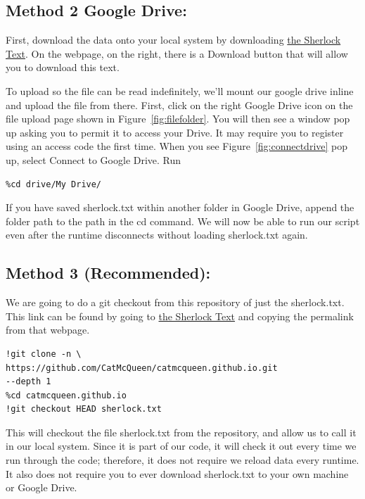 \documentclass{article}
\begin{document}
\subsection{Method 2 Google Drive:}

First, download the data onto your local system by downloading 
\href{https://github.com/CatMcQueen/catmcqueen.github.io/blob/b67a282c9be6bfd1ed17796c2507b9108cffb6bc/sherlock.txt}{the Sherlock Text}. On the webpage, on the right, there is a Download button that will allow you to download this text.

To upload so the file can be read indefinitely, we'll mount our google drive inline and upload the file from there. First, click on the right Google Drive icon on the file upload page shown in Figure~\ref{fig:filefolder}. You will then see a window pop up asking you to permit it to access your Drive. It may require you to register using an access code the first time. When you see Figure~\ref{fig:connectdrive} pop up, select Connect to Google Drive. Run

\begin{verbatim}
%cd drive/My Drive/
\end{verbatim}

If you have saved sherlock.txt within another folder in Google Drive, append the folder path to the path in the cd command. We will now be able to run our script even after the runtime disconnects without loading sherlock.txt again.

\subsection{Method 3 (Recommended):}

We are going to do a git checkout from this repository of just the sherlock.txt. This link can be found by going to \href{https://github.com/CatMcQueen/catmcqueen.github.io/blob/main/sherlock.txt}{the Sherlock Text} and copying the permalink from that webpage.

\begin{verbatim}
!git clone -n \ 
https://github.com/CatMcQueen/catmcqueen.github.io.git 
--depth 1
%cd catmcqueen.github.io
!git checkout HEAD sherlock.txt
\end{verbatim}

This will checkout the file sherlock.txt from the repository, and allow us to call it in our local system. Since it is part of our code, it will check it out every time we run through the code; therefore, it does not require we reload data every runtime. It also does not require you to ever download sherlock.txt to your own machine or Google Drive.  
\end{document}
